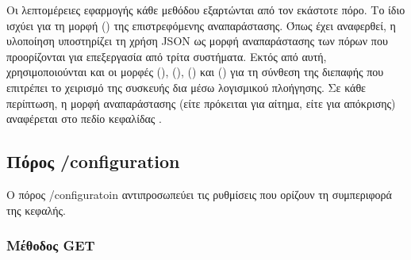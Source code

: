 Οι λεπτομέρειες εφαρμογής κάθε μεθόδου εξαρτώνται από τον εκάστοτε πόρο. Το ίδιο
ισχύει για τη μορφή () της επιστρεφόμενης αναπαράστασης. Όπως
έχει αναφερθεί, η υλοποίηση υποστηρίζει τη χρήση JSON ως μορφή αναπαράστασης των
πόρων που προορίζονται για επεξεργασία από τρίτα συστήματα. Εκτός από αυτή,
χρησιμοποιούνται και οι μορφές (), (),
() και () για τη σύνθεση της
διεπαφής που επιτρέπει το χειρισμό της συσκευής δια μέσω λογισμικού πλοήγησης.
Σε κάθε περίπτωση, η μορφή αναπαράστασης (είτε πρόκειται για αίτημα, είτε για
απόκρισης) αναφέρεται στο πεδίο κεφαλίδας 
\parencite[124]{rfc2616}.


\subsection{Πόρος /configuration}

Ο πόρος /configuratoin αντιπροσωπεύει τις ρυθμίσεις που ορίζουν τη συμπεριφορά
της κεφαλής.


\subsubsection{Μέθοδος GET}
\label{ssubsec:network:config-get}

